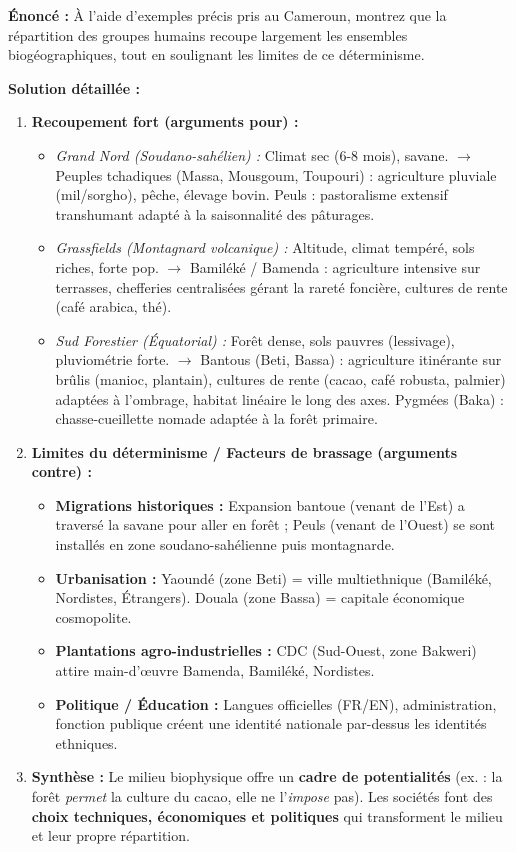 \documentclass[11pt]{article}
\begin{document}
\begin{exoresolu}
\textbf{Énoncé :} À l'aide d'exemples précis pris au Cameroun, montrez que la répartition des groupes humains recoupe largement les ensembles biogéographiques, tout en soulignant les limites de ce déterminisme.

\textbf{Solution détaillée :}
\begin{enumerate}
    \item \textbf{Recoupement fort (arguments pour) :}
    \begin{itemize}
        \item \textit{Grand Nord (Soudano-sahélien) :} Climat sec (6-8 mois), savane. $\rightarrow$ Peuples tchadiques (Massa, Mousgoum, Toupouri) : agriculture pluviale (mil/sorgho), pêche, élevage bovin. Peuls : pastoralisme extensif transhumant adapté à la saisonnalité des pâturages.
        \item \textit{Grassfields (Montagnard volcanique) :} Altitude, climat tempéré, sols riches, forte pop. $\rightarrow$ Bamiléké / Bamenda : agriculture intensive sur terrasses, chefferies centralisées gérant la rareté foncière, cultures de rente (café arabica, thé).
        \item \textit{Sud Forestier (Équatorial) :} Forêt dense, sols pauvres (lessivage), pluviométrie forte. $\rightarrow$ Bantous (Beti, Bassa) : agriculture itinérante sur brûlis (manioc, plantain), cultures de rente (cacao, café robusta, palmier) adaptées à l'ombrage, habitat linéaire le long des axes. Pygmées (Baka) : chasse-cueillette nomade adaptée à la forêt primaire.
    \end{itemize}
    \item \textbf{Limites du déterminisme / Facteurs de brassage (arguments contre) :}
    \begin{itemize}
        \item \textbf{Migrations historiques :} Expansion bantoue (venant de l'Est) a traversé la savane pour aller en forêt ; Peuls (venant de l'Ouest) se sont installés en zone soudano-sahélienne puis montagnarde.
        \item \textbf{Urbanisation :} Yaoundé (zone Beti) = ville multiethnique (Bamiléké, Nordistes, Étrangers). Douala (zone Bassa) = capitale économique cosmopolite.
        \item \textbf{Plantations agro-industrielles :} CDC (Sud-Ouest, zone Bakweri) attire main-d'œuvre Bamenda, Bamiléké, Nordistes.
        \item \textbf{Politique / Éducation :} Langues officielles (FR/EN), administration, fonction publique créent une identité nationale par-dessus les identités ethniques.
    \end{itemize}
    \item \textbf{Synthèse :} Le milieu biophysique offre un \textbf{cadre de potentialités} (ex. : la forêt \emph{permet} la culture du cacao, elle ne l'\emph{impose} pas). Les sociétés font des \textbf{choix techniques, économiques et politiques} qui transforment le milieu et leur propre répartition.
\end{enumerate}
\end{exoresolu}
\end{document}
